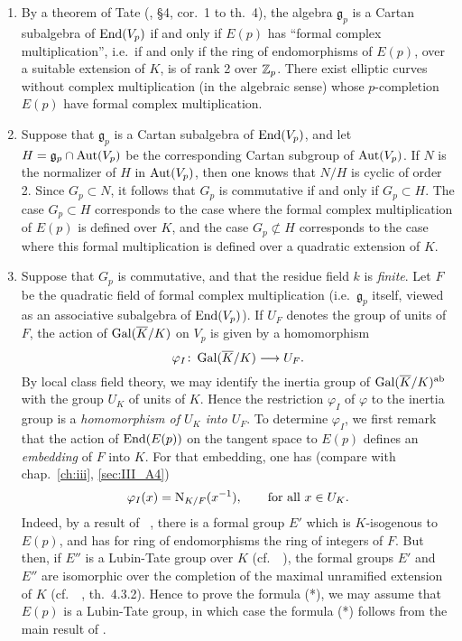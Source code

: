 \begin{subappendices}
\begin{obs}
\begin{enumerate}[wide]
	\item By a theorem of Tate (\cite{39}, \S4, cor.~1 to th.~4), the
		algebra $\mathfrak{g}_p$ is a Cartan subalgebra of $\operatorname{End}(V_p)$
		if and only if $E(p)$ has ``formal complex multiplication'',
		i.e.\ if and only if the ring of endomorphisms of $E(p)$, over
		a suitable extension of $K$, is of rank 2 over $\mathbb{Z}_p$. There
		exist elliptic curves without complex multiplication (in the
		algebraic sense) whose $p$-completion $E(p)$ have formal
		complex multiplication.
	\item Suppose that $\mathfrak{g}_p$ is a Cartan subalgebra of
		$\operatorname{End}(V_p)$, and let $H = \mathfrak{g}_p \cap \operatorname{Aut}(V_p)$ be the
		corresponding Cartan subgroup of $\operatorname{Aut}(V_p)$. If $N$ is the
		normalizer of $H$ in $\operatorname{Aut}(V_p)$, then one knows that $N/H$ is
		cyclic of order 2. Since $G_p \subset N$, it follows that $G_p$
		is commutative if and only if $G_p \subset H$. The case $G_p
		\subset H$ corresponds to the case where the formal complex
		multiplication of $E(p)$ is
		\dpage
		defined over $K$, and the case $G_p \not\subset H$ corresponds to
		the case where this formal multiplication is defined over a
		quadratic extension of $K$.
	\item Suppose that $G_p$ is commutative, and that the residue field $k$
		is \emph{finite}. Let $F$ be the quadratic field of formal
		complex multiplication (i.e.\ $\mathfrak{g}_p$ itself, viewed
		as an associative subalgebra of $\operatorname{End}(V_p)$). If $U_F$ denotes
		the group of units of $F$, the action of $\operatorname{Gal}(\overline{K}/K)$ on
		$V_p$ is given by a homomorphism
		\[
			\varphi_I \colon \operatorname{Gal}(\overline{K}/K) \longrightarrow U_F.
		\]
		By local class field theory, we may identify the inertia group
		of $\operatorname{Gal}(\overline{K}/K)^{\mathrm{ab}}$ with the group $U_K$ of units of
		$K$. Hence the restriction $\varphi_I$ of $\varphi$ to the
		inertia group is a \emph{homomorphism of $U_K$ into $U_F$}.  To
		determine $\varphi_I$, we first remark that the action of
		$\operatorname{End}(E(p))$ on the tangent space to $E(p)$ defines an
		\emph{embedding} of $F$ into $K$. For that embedding, one has
		(compare with chap.~\ref{ch:iii}, \ref{sec:III_A4})
		\[
			\varphi_I(x) = \operatorname{N}_{K/F}(x^{-1}), \qquad \text{for
				all } x\in U_K.
		\]
		Indeed, by a result of \citeauthor{lubin:lie}~\cite{lubin:lie},
		there is a formal group $E'$ which is $K$-isogenous to $E(p)$,
		and has for ring of endomorphisms the ring of integers of $F$.
		But then, if $E''$ is a Lubin-Tate group over $K$ (cf.\
		\citeauthor{17}~\cite{17}), the formal groups $E'$ and $E''$
		are isomorphic over the completion of the maximal unramified
		extension of $K$ (cf.\ \citeauthor{16}~\cite{16}, th.~4.3.2).
		Hence to prove the formula (*),
		we may assume that $E(p)$ is a
		Lubin-Tate group, in which case the formula (*) follows from
		the main result of \cite{17}.
\end{enumerate}
\end{obs}


\end{subappendices}
